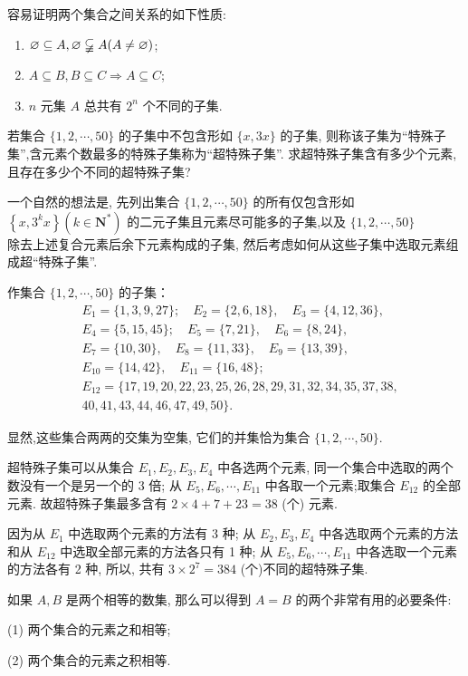容易证明两个集合之间关系的如下性质:
\begin{enumerate}
	\item $\varnothing \subseteq A, \varnothing \varsubsetneqq A(A \neq \varnothing)$;
	\item $A \subseteq B, B \subseteq C \Rightarrow A \subseteq C$;
	\item $n$ 元集 $A$ 总共有 $2^{n}$ 个不同的子集.
\end{enumerate}
\begin{example}
	若集合 $\{1,2, \cdots, 50\}$ 的子集中不包含形如 $\{x, 3 x\}$ 的子集, 则称该子集为“特殊子集”,含元素个数最多的特殊子集称为“超特殊子集”. 求超特殊子集含有多少个元素,且存在多少个不同的超特殊子集?
\end{example}

\begin{analysis}
	一个自然的想法是, 先列出集合 $\{1,2, \cdots, 50\}$ 的所有仅包含形如 $\left\{x, 3^{k} x\right\}\left(k \in \mathbf{N}^{*}\right)$ 的二元子集且元素尽可能多的子集,以及 $\{1,2, \cdots, 50\}$\\
	除去上述复合元素后余下元素构成的子集, 然后考虑如何从这些子集中选取元素组成超“特殊子集”.
\end{analysis}
\begin{solution}
	作集合 $\{1,2, \cdots, 50\}$ 的子集：
	$$
		\begin{aligned}
			 & E_{1}=\{1,3,9,27\} ; \quad E_{2}=\{2,6,18\}, \quad E_{3}=\{4,12,36\}, \\
			 & E_{4}=\{5,15,45\} ; \quad E_{5}=\{7,21\}, \quad E_{6}=\{8,24\},       \\
			 & E_{7}=\{10,30\}, \quad E_{8}=\{11,33\}, \quad E_{9}=\{13,39\},        \\
			 & E_{10}=\{14,42\}, \quad E_{11}=\{16,48\} ;                            \\
			 & E_{12}=\{17,19,20,22,23,25,26,28,29,31,32,34,35,37,38,                \\
			 & 40,41,43,44,46,47,49,50\} .
		\end{aligned}
	$$

	显然,这些集合两两的交集为空集, 它们的并集恰为集合 $\{1,2, \cdots, 50\}$.

	超特殊子集可以从集合 $E_{1} ,  E_{2} ,  E_{3} ,  E_{4}$ 中各选两个元素, 同一个集合中选取的两个数没有一个是另一个的 3 倍; 从 $E_{5}, E_{6}, \cdots, E_{11}$ 中各取一个元素;取集合 $E_{12}$ 的全部元素. 故超特殊子集最多含有 $2 \times 4+7+23=38$ (个) 元素.

	因为从 $E_{1}$ 中选取两个元素的方法有 3 种; 从 $E_{2} ,  E_{3} ,  E_{4}$ 中各选取两个元素的方法和从 $E_{12}$ 中选取全部元素的方法各只有 1 种; 从 $E_{5}, E_{6}, \cdots, E_{11}$ 中各选取一个元素的方法各有 2 种, 所以, 共有 $3 \times 2^{7}=384$ (个)不同的超特殊子集.

	如果 $A ,  B$ 是两个相等的数集, 那么可以得到 $A=B$ 的两个非常有用的必要条件:

	(1) 两个集合的元素之和相等;

	(2) 两个集合的元素之积相等.
\end{solution}

